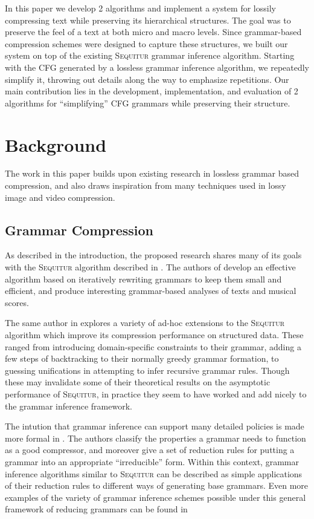 \documentclass[11pt]{article}
\newcommand{\Sequitur}{\textsc{Sequitur}\xspace}
\begin{document}
In this paper we develop 2 algorithms and implement a system for lossily
compressing text while preserving its hierarchical structures. The goal
was to preserve the feel of a text at both micro and macro levels. 
Since grammar-based compression schemes were designed to capture
these structures, we built
our system on top of the existing \Sequitur grammar inference algorithm. 
Starting with the CFG generated by a lossless grammar
inference algorithm, we repeatedly simplify it, throwing out details
along the way to emphasize repetitions. Our main contribution lies in the
development, implementation, and evaluation of 2 algorithms for 
``simplifying'' CFG grammars while preserving their structure.

\section{Background}

The work in this paper builds upon existing research in lossless
grammar based compression, and also draws inspiration from many
techniques used in lossy image and video compression.

\subsection{Grammar Compression}
As described in the introduction, the proposed research shares many of its
goals with the \Sequitur algorithm described in \cite{sequitur}.  The authors
of \cite{sequitur} develop an effective algorithm based on iteratively
rewriting grammars to keep them small and efficient, and produce interesting
grammar-based analyses of texts and musical scores.  

The same author in \cite{nevillphd}
explores a variety of ad-hoc extensions to the \Sequitur algorithm which
improve its compression performance on structured data.  These ranged from
introducing domain-specific constraints to their grammar, adding a few steps of
backtracking to their normally greedy grammar formation, to guessing
unifications in attempting to infer recursive grammar rules.  Though these may
invalidate some of their theoretical results on the asymptotic performance of
\Sequitur, in practice they seem to have worked and add nicely to the grammar
inference framework.

The intution that grammar inference can support many detailed policies is made
more formal in \cite{grammarcodes}.  The authors classify the properties a
grammar needs to function as a good compressor, and moreover give a set of
reduction rules for putting a grammar into an appropriate
``irreducible'' form.  Within this
context, grammar inference algorithms similar to \Sequitur can be described as
simple applications of their reduction rules to different ways of generating
base grammars.  Even more examples of the variety of grammar inference schemes
possible under this general framework of reducing grammars can be found in
\cite{efficientgreedy}
\end{document}
